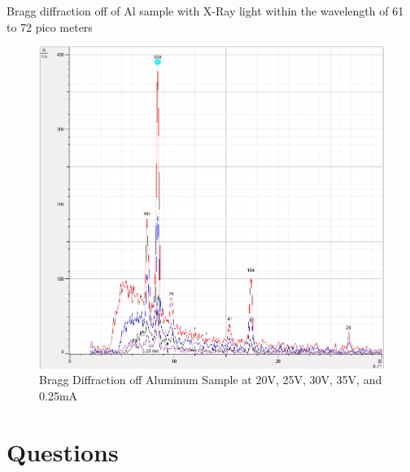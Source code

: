 \documentclass{amsart}
\begin{document}
{\centering Bragg diffraction off of Al sample with X-Ray light within the wavelength of 61 to 72 pico meters}
\begin{figure}[H]
    \centering
    \includegraphics[width=\textwidth]{Al_annotations.PNG}
    \caption{Bragg Diffraction off Aluminum Sample at 20V, 25V, 30V, 35V, and 0.25mA}
\end{figure}

\section{Questions}

\end{document}
